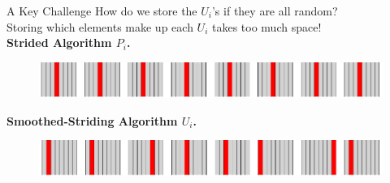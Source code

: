 \documentclass[xcolor=x11names, svgnames, rgb]{beamer}
\begin{document}


\begin{frame}[t]{A Key Challenge}
How do we store the $U_i$'s if they are all random?	\\
\vspace{0.5cm}
Storing which elements make up each $U_i$ takes too much space!\\

\vspace{0.5cm}
\textbf{Strided Algorithm $P_i$.}
\begin{figure}
	\includegraphics[width=\linewidth]{imgs/stridedAlgHighlighted.png}
\end{figure}
\textbf{Smoothed-Striding Algorithm $U_i$.}
\begin{figure}
	\includegraphics[width=\linewidth]{imgs/smoothedStridingAlgHighlighted.png}
\end{figure}
\end{frame}
\end{document}
